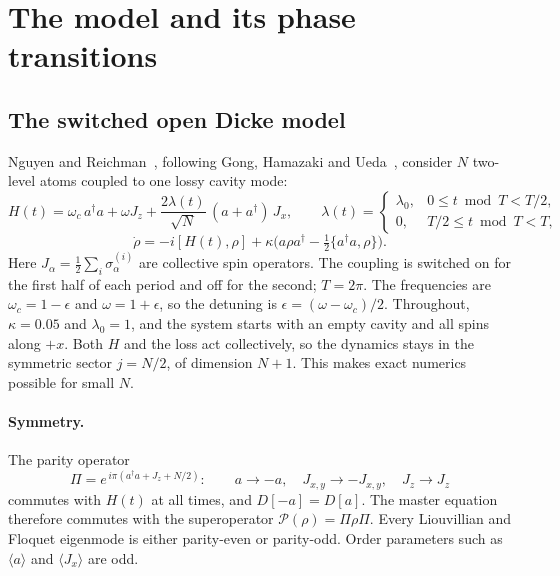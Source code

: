 \documentclass[11pt,a4paper]{article}
\newcommand{\ev}[1]{\langle #1\rangle}
\newcommand{\ad}{a^\dagger}
\begin{document}
\section{The model and its phase transitions}\label{sec:model}

\subsection{The switched open Dicke model}

Nguyen and Reichman~\cite{nguyen2026}, following Gong, Hamazaki and Ueda~\cite{gong2018},
consider $N$ two-level atoms coupled to one lossy cavity mode:
\begin{equation}
H(t)=\omega_c\,\ad a+\omega J_z+\frac{2\lambda(t)}{\sqrt N}\,(a+\ad)\,J_x,
\qquad
\lambda(t)=\begin{cases}\lambda_0,& 0\le t \bmod T<T/2,\\ 0,& T/2\le t\bmod T<T,\end{cases}
\label{eq:H}
\end{equation}
\begin{equation}
\dot\rho=-i[H(t),\rho]+\kappa\Big(a\rho\ad-\tfrac12\{\ad a,\rho\}\Big).
\label{eq:lindblad}
\end{equation}
Here $J_\alpha=\tfrac12\sum_i\sigma^{(i)}_\alpha$ are collective spin operators. The coupling
is switched on for the first half of each period and off for the second; $T=2\pi$. The
frequencies are $\omega_c=1-\epsilon$ and $\omega=1+\epsilon$, so the detuning is
$\epsilon=(\omega-\omega_c)/2$. Throughout, $\kappa=0.05$ and $\lambda_0=1$, and the system
starts with an empty cavity and all spins along $+x$. Both $H$ and the loss act collectively, so
the dynamics stays in the symmetric sector $j=N/2$, of dimension $N+1$. This makes exact
numerics possible for small $N$.

\paragraph{Symmetry.} The parity operator
\begin{equation}
\Pi=e^{\,i\pi(\ad a+J_z+N/2)}:\qquad a\to-a,\quad J_{x,y}\to-J_{x,y},\quad J_z\to J_z
\end{equation}
commutes with $H(t)$ at all times, and $D[-a]=D[a]$. The master equation therefore commutes with
the superoperator $\mathcal P(\rho)=\Pi\rho\Pi$. Every Liouvillian and Floquet eigenmode is
either parity-even or parity-odd. Order parameters such as $\ev{a}$ and $\ev{J_x}$ are odd.
\end{document}
